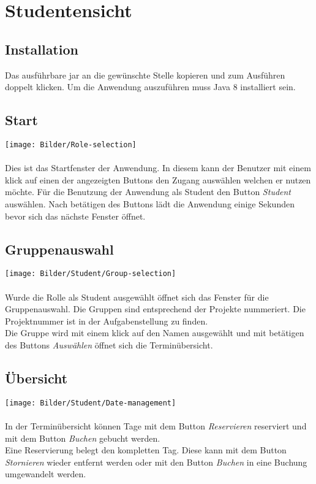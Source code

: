 \section{Studentensicht}

\subsection{Installation}
Das ausführbare jar an die gewünschte Stelle kopieren und zum Ausführen doppelt klicken.
Um die Anwendung auszuführen muss Java 8 installiert sein. 

\subsection{Start}
\texttt{[image: Bilder/Role-selection]}
\\
\\
Dies ist das Startfenster der Anwendung. In diesem kann der Benutzer mit einem klick auf einen der angezeigten Buttons den Zugang auswählen welchen er nutzen möchte. Für die Benutzung der Anwendung als Student den Button \textit{Student} auswählen. Nach betätigen des Buttons lädt die Anwendung einige Sekunden bevor sich das nächste Fenster öffnet.


\subsection{Gruppenauswahl}
\texttt{[image: Bilder/Student/Group-selection]}
\\
\\
Wurde die Rolle als Student ausgewählt öffnet sich das Fenster für die Gruppenauswahl. Die Gruppen sind entsprechend der Projekte nummeriert. Die Projektnummer ist in der Aufgabenstellung zu finden. 
\\
Die Gruppe wird mit einem klick auf den Namen ausgewählt und mit betätigen des Buttons \textit{Auswählen} öffnet sich die Terminübersicht.

\subsection{Übersicht}
\texttt{[image: Bilder/Student/Date-management]}
\\
\\
In der Terminübersicht können Tage mit dem Button \textit{Reservieren} reserviert und mit dem Button \textit{Buchen} gebucht werden. 
\\
Eine Reservierung belegt den kompletten Tag. Diese kann mit dem Button \textit{Stornieren} wieder entfernt werden oder mit den Button \textit{Buchen} in eine Buchung umgewandelt werden.

